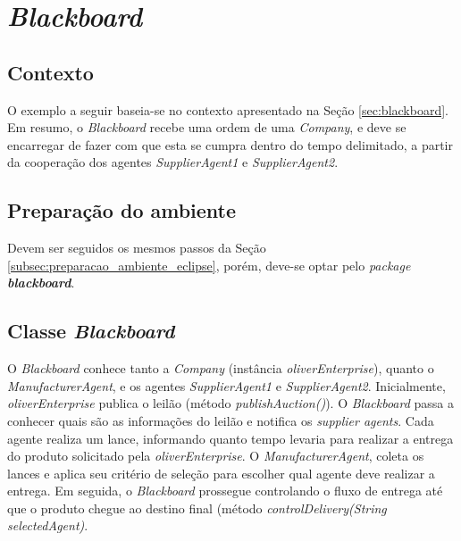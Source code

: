 
\section{\textit{Blackboard}}\label{appendix:blackboard}

\subsection{Contexto}

O exemplo a seguir baseia-se no contexto apresentado na Seção \ref{sec:blackboard}. Em resumo, o \textit{Blackboard} recebe uma ordem de uma \textit{Company}, e deve se encarregar de fazer com que esta se cumpra dentro do tempo delimitado, a partir da cooperação dos agentes \textit{SupplierAgent1} e \textit{SupplierAgent2}. 

\subsection{Preparação do ambiente}

Devem ser seguidos os mesmos passos da Seção \ref{subsec:preparacao_ambiente_eclipse}, porém, deve-se optar pelo \textit{package} \textit{\textbf{blackboard}}.

\subsection{Classe \textit{Blackboard}}

O \textit{Blackboard} conhece tanto a \textit{Company} (instância \textit{oliverEnterprise}), quanto o \textit{ManufacturerAgent}, e os agentes \textit{SupplierAgent1} e \textit{SupplierAgent2}. Inicialmente, \textit{oliverEnterprise} publica o leilão (método \textit{publishAuction()}). O \textit{Blackboard} passa a conhecer quais são as informações do leilão e notifica os \textit{supplier agents}. 
Cada agente realiza um lance, informando quanto tempo levaria para realizar a entrega do produto solicitado pela \textit{oliverEnterprise}. O \textit{ManufacturerAgent}, coleta os lances e aplica seu critério de seleção para escolher qual agente deve realizar a entrega. Em seguida, o \textit{Blackboard} prossegue controlando o fluxo de entrega até que o produto chegue ao destino final (método \textit{controlDelivery(String selectedAgent)}.

